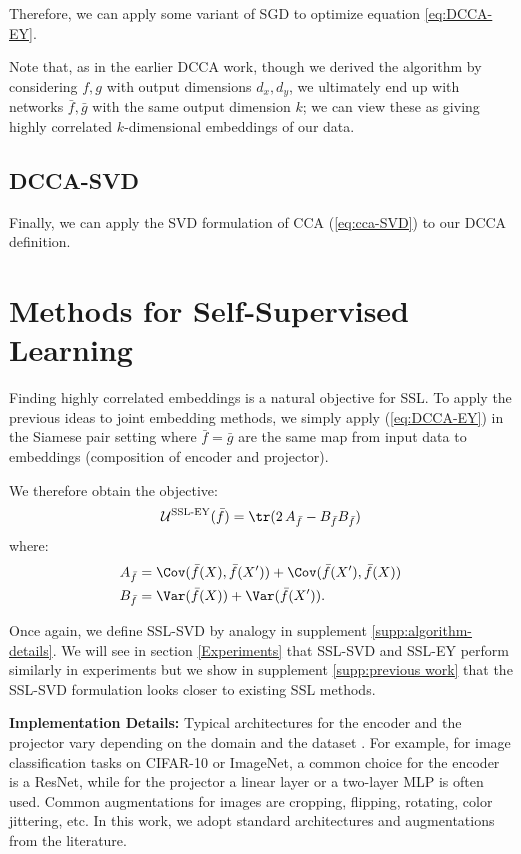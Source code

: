 Therefore, we can apply some variant of SGD to optimize equation \ref{eq:DCCA-EY}.

Note that, as in the earlier DCCA work, though we derived the algorithm by considering $f,g$ with output dimensions $d_x,d_y$, we ultimately end up with networks $\bar{f},\bar{g}$ with the same output dimension $k$; we can view these as giving highly correlated $k$-dimensional embeddings of our data.

\subsection{DCCA-SVD}

Finally, we can apply the SVD formulation of CCA (\ref{eq:cca-SVD}) to our DCCA definition. 



\section{Methods for Self-Supervised Learning}


Finding highly correlated embeddings is a natural objective for SSL.
To apply the previous ideas to joint embedding methods, we simply apply (\ref{eq:DCCA-EY}) in the Siamese pair setting where $\bar{f}=\bar{g}$ are the same map from input data to embeddings (composition of encoder and projector).

We therefore obtain the objective:
\begin{align}\label{eq:SSL-EY}
    \mathcal{U}^\text{SSL-EY}(\bar{f}) =\tr( 2 \, A_{\bar{f}} - B_{\bar{f}} B_{\bar{f}})
\end{align}
where:
\begin{align*}
    A_{\bar{f}}
    &= \Cov(\bar{f}(X),\bar{f}(X')) + \Cov(\bar{f}(X'),\bar{f}(X)) \\
    B_{\bar{f}} 
    &= \Var(\bar{f}(X)) + \Var(\bar{f}(X')).
\end{align*}

Once again, we define SSL-SVD by analogy in supplement \ref{supp:algorithm-details}. We will see in section \ref{Experiments} that SSL-SVD and SSL-EY perform similarly in experiments but we show in supplement \ref{supp:previous work} that the SSL-SVD formulation looks closer to existing SSL methods.

\textbf{Implementation Details:} Typical architectures for the encoder and the projector vary depending on the domain and the dataset \cite{balestriero2023cookbook}. For example, for image classification tasks on CIFAR-10 or ImageNet, a common choice for the encoder is a ResNet, while for the projector a linear layer or a two-layer MLP is often used. Common augmentations for images are cropping, flipping, rotating, color jittering, etc. In this work, we adopt standard architectures and augmentations from the literature.


